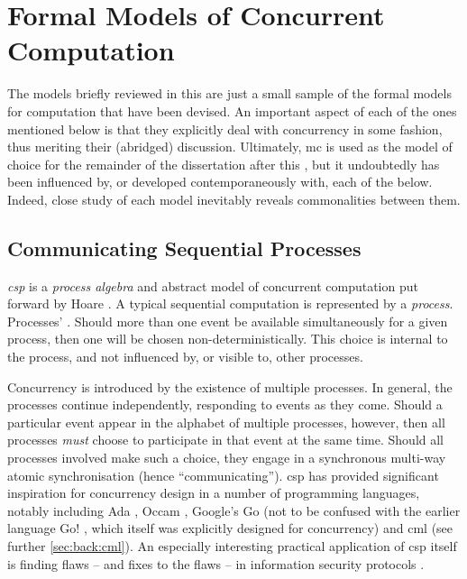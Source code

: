\section{\label{sec:back:formalmodels}Formal Models of Concurrent Computation}
The models briefly reviewed in this  are just a small sample of the formal models for computation that have been devised.  An important aspect of each of the ones mentioned below is that they explicitly deal with concurrency in some fashion, thus meriting their (abridged) discussion.  Ultimately, \gls{mc} is used as the model of choice for the remainder of the dissertation after this , but it undoubtedly has been influenced by, or developed contemporaneously with, each of the below.  Indeed, close study of each model inevitably reveals commonalities between them.

\subsection{\label{subsec:back:csp}Communicating Sequential Processes}

\emph{\Gls{csp}} is a \emph{process algebra} and abstract model of concurrent computation put forward by Hoare \cite{Hoare1985,Roscoe2011}.  A typical sequential computation is represented by a \emph{process}.  Processes' .  Should more than one event be available simultaneously for a given process, then one will be chosen non-deterministically.  This choice is internal to the process, and not influenced by, or visible to, other processes.

Concurrency is introduced by the existence of multiple processes.  In general, the processes continue independently, responding to events as they come.  Should a particular event appear in the alphabet of multiple processes, however, then all processes \emph{must} choose to participate in that event at the same time.  Should all processes involved make such a choice, they engage in a synchronous multi-way atomic synchronisation (hence ``communicating'').  \gls{csp} has provided significant inspiration for concurrency design in a number of programming languages, notably including Ada \cite{Defense1983,Taft2013}, Occam \cite{Elizabeth1987}, Google's Go \cite{Meyerson2014} (not to be confused with the earlier language Go! \cite{Clark2004}, which itself was explicitly designed for concurrency) and \gls{cml} \cite{Reppy2011} (see further \vref{sec:back:cml}).  An especially interesting practical application of \gls{csp} itself is finding flaws -- and fixes to the flaws -- in information security protocols \cite{Roscoe1995,Lowe1996,Koltuksuz2010}.


